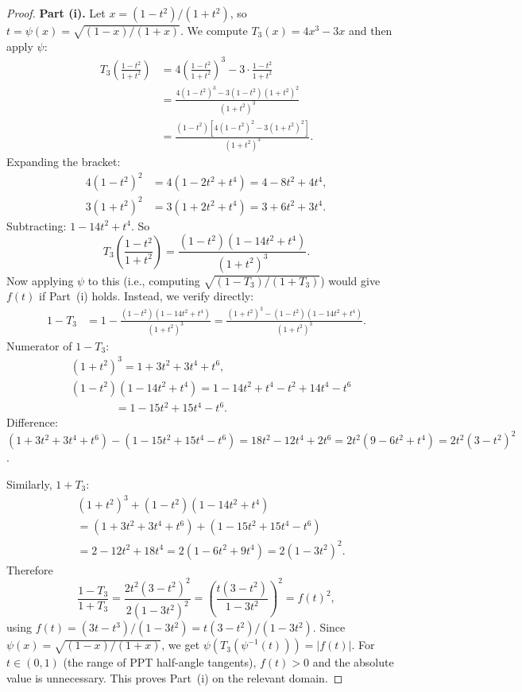 \documentclass[12pt]{amsart}
\theoremstyle{definition}
\theoremstyle{remark}
\begin{document}
\begin{proof}
\textbf{Part (i).}
Let $x = (1-t^2)/(1+t^2)$, so $t = \psi(x) = \sqrt{(1-x)/(1+x)}$.
We compute $T_3(x) = 4x^3-3x$ and then apply $\psi$:
\begin{align*}
  T_3\!\left(\frac{1-t^2}{1+t^2}\right)
  &= 4\left(\frac{1-t^2}{1+t^2}\right)^3 - 3\cdot\frac{1-t^2}{1+t^2} \\
  &= \frac{4(1-t^2)^3 - 3(1-t^2)(1+t^2)^2}{(1+t^2)^3} \\
  &= \frac{(1-t^2)[4(1-t^2)^2 - 3(1+t^2)^2]}{(1+t^2)^3}.
\end{align*}
Expanding the bracket:
\begin{align*}
  4(1-t^2)^2 &= 4(1-2t^2+t^4) = 4-8t^2+4t^4, \\
  3(1+t^2)^2 &= 3(1+2t^2+t^4) = 3+6t^2+3t^4.
\end{align*}
Subtracting: $1-14t^2+t^4$.  So
\[
  T_3\!\left(\frac{1-t^2}{1+t^2}\right)
  = \frac{(1-t^2)(1-14t^2+t^4)}{(1+t^2)^3}.
\]
Now applying $\psi$ to this (i.e., computing $\sqrt{(1-T_3)/(1+T_3)}$)
would give $f(t)$ if Part~(i) holds.  Instead, we verify directly:
\begin{align*}
  1 - T_3 &= 1 - \frac{(1-t^2)(1-14t^2+t^4)}{(1+t^2)^3}
            = \frac{(1+t^2)^3 - (1-t^2)(1-14t^2+t^4)}{(1+t^2)^3}.
\end{align*}
Numerator of $1-T_3$:
\begin{align*}
  &(1+t^2)^3 = 1+3t^2+3t^4+t^6, \\
  &(1-t^2)(1-14t^2+t^4) = 1-14t^2+t^4-t^2+14t^4-t^6 \\
  &\qquad\qquad = 1-15t^2+15t^4-t^6.
\end{align*}
Difference: $(1+3t^2+3t^4+t^6)-(1-15t^2+15t^4-t^6) = 18t^2-12t^4+2t^6
= 2t^2(9-6t^2+t^4) = 2t^2(3-t^2)^2$.

Similarly, $1+T_3$:
\begin{align*}
  &(1+t^2)^3 + (1-t^2)(1-14t^2+t^4) \\
  &= (1+3t^2+3t^4+t^6) + (1-15t^2+15t^4-t^6) \\
  &= 2-12t^2+18t^4 = 2(1-6t^2+9t^4) = 2(1-3t^2)^2.
\end{align*}
Therefore
\[
  \frac{1-T_3}{1+T_3} = \frac{2t^2(3-t^2)^2}{2(1-3t^2)^2}
  = \left(\frac{t(3-t^2)}{1-3t^2}\right)^{\!2}
  = f(t)^2,
\]
using $f(t) = (3t-t^3)/(1-3t^2) = t(3-t^2)/(1-3t^2)$.  Since
$\psi(x) = \sqrt{(1-x)/(1+x)}$, we get $\psi(T_3(\psi^{-1}(t))) = |f(t)|$.
For $t\in(0,1)$ (the range of PPT half-angle tangents), $f(t)>0$ and
the absolute value is unnecessary.  This proves Part~(i) on the relevant
domain.


\end{proof}
\end{document}
